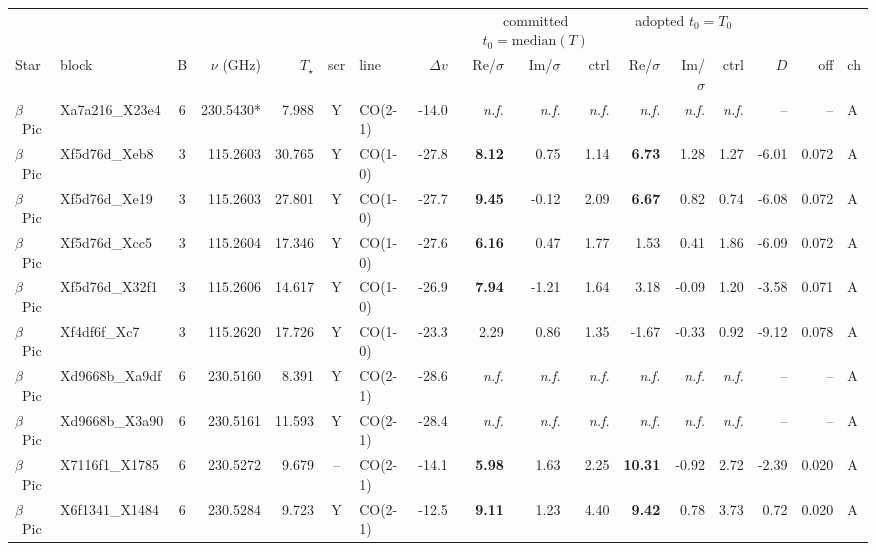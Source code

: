 \begin{tabular}{@{}l@{~}l@{~}c@{~}r@{~}r@{~}c@{~}l@{~}r@{~~}r@{~}r@{~}r@{~~}r@{~}r@{~}r@{~~}r@{~}r@{~}l@{}}
\hline
& & & & & & & & \multicolumn{3}{c}{committed $t_0=\mathrm{median}(T)$} & \multicolumn{3}{c}{adopted $t_0=T_0$} & & & \\
Star & block & B & $\nu$ (GHz) & $T_\star$ & scr & line & $\Delta v$ & Re/$\sigma$ & Im/$\sigma$ & ctrl & Re/$\sigma$ & Im/$\sigma$ & ctrl & $D$ & off & ch \\
\hline
$\beta$~Pic & Xa7a216\_X23e4 & 6 & 230.5430* & 7.988 & Y & CO(2-1) & -14.0 & \emph{n.f.} & \emph{n.f.} & \emph{n.f.} & \emph{n.f.} & \emph{n.f.} & \emph{n.f.} & -- & -- & A \\
$\beta$~Pic & Xf5d76d\_Xeb8 & 3 & 115.2603 & 30.765 & Y & CO(1-0) & -27.8 & \textbf{8.12} & 0.75 & 1.14 & \textbf{6.73} & 1.28 & 1.27 & -6.01 & 0.072 & A \\
$\beta$~Pic & Xf5d76d\_Xe19 & 3 & 115.2603 & 27.801 & Y & CO(1-0) & -27.7 & \textbf{9.45} & -0.12 & 2.09 & \textbf{6.67} & 0.82 & 0.74 & -6.08 & 0.072 & A \\
$\beta$~Pic & Xf5d76d\_Xcc5 & 3 & 115.2604 & 17.346 & Y & CO(1-0) & -27.6 & \textbf{6.16} & 0.47 & 1.77 & 1.53 & 0.41 & 1.86 & -6.09 & 0.072 & A \\
$\beta$~Pic & Xf5d76d\_X32f1 & 3 & 115.2606 & 14.617 & Y & CO(1-0) & -26.9 & \textbf{7.94} & -1.21 & 1.64 & 3.18 & -0.09 & 1.20 & -3.58 & 0.071 & A \\
$\beta$~Pic & Xf4df6f\_Xc7 & 3 & 115.2620 & 17.726 & Y & CO(1-0) & -23.3 & 2.29 & 0.86 & 1.35 & -1.67 & -0.33 & 0.92 & -9.12 & 0.078 & A \\
$\beta$~Pic & Xd9668b\_Xa9df & 6 & 230.5160 & 8.391 & Y & CO(2-1) & -28.6 & \emph{n.f.} & \emph{n.f.} & \emph{n.f.} & \emph{n.f.} & \emph{n.f.} & \emph{n.f.} & -- & -- & A \\
$\beta$~Pic & Xd9668b\_X3a90 & 6 & 230.5161 & 11.593 & Y & CO(2-1) & -28.4 & \emph{n.f.} & \emph{n.f.} & \emph{n.f.} & \emph{n.f.} & \emph{n.f.} & \emph{n.f.} & -- & -- & A \\
$\beta$~Pic & X7116f1\_X1785 & 6 & 230.5272 & 9.679 & -- & CO(2-1) & -14.1 & \textbf{5.98} & 1.63 & 2.25 & \textbf{10.31} & -0.92 & 2.72 & -2.39 & 0.020 & A \\
$\beta$~Pic & X6f1341\_X1484 & 6 & 230.5284 & 9.723 & Y & CO(2-1) & -12.5 & \textbf{9.11} & 1.23 & 4.40 & \textbf{9.42} & 0.78 & 3.73 & 0.72 & 0.020 & A \\

\end{tabular}

